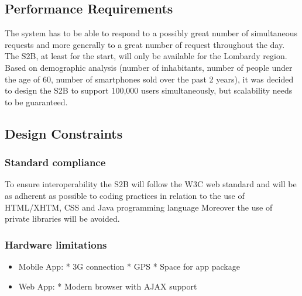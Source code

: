 	
	\bigskip
	\noindent{}
	\begin{enumerate}[resume, label={[R\arabic*]}]
		\item {}
		\item {}
		\item {}
	\end{enumerate}
	
\subsection{Performance Requirements}
The system has to be able to respond to a possibly great number of simultaneous requests and
more generally to a great number of request throughout the day.
The S2B, at least for the start, will only be available for the Lombardy region. Based on demographic analysis (number of inhabitants, number of people under the age of 60, number of smartphones sold over the past 2 years), it was decided to design the S2B to support 100,000 users simultaneously, but scalability needs to be guaranteed.
\subsection{Design Constraints}
	\subsubsection{Standard compliance}
	To ensure interoperability the S2B will follow the W3C web standard and will be as adherent as possible to  coding practices in relation to the use of HTML/XHTM, CSS and Java programming language
	Moreover the use of private libraries will be avoided.
	\subsubsection{Hardware limitations}
		\begin{itemize}
		\item Mobile App: \newline
		* 3G connection\newline
		* GPS\newline
		* Space for app package
		\item Web App:\newline
		* Modern browser with AJAX support
		\end{itemize}
	

